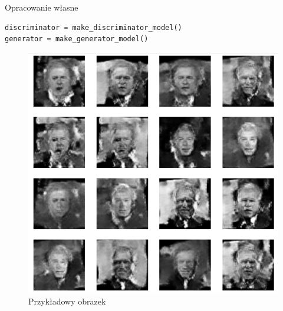 \documentclass[wi]{zut}
\begin{document}
{Opracowanie własne}{\label{kod:przyklad}}
\begin{lstlisting}[language=Python]
discriminator = make_discriminator_model()
generator = make_generator_model()
\end{lstlisting}

\begin{figure}[H]
    \centering
    \includegraphics[width=0.7\linewidth]{images/sample.png}
    \vspace{1em}
    \caption{Przykładowy obrazek}
    \label{fig:pdgd}
\end{figure}
\end{document}
